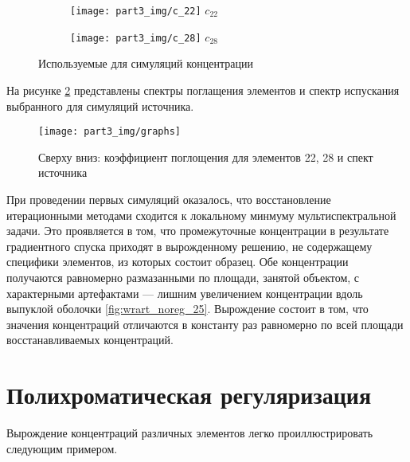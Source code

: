 \begin{figure}
\begin{subfigure}[h]{0.45\textwidth}
  \centering
    \texttt{[image: part3\_img/c\_22]}
  $c_22$
\end{subfigure}
\begin{subfigure}[h]{0.45\textwidth}
  \centering
    \texttt{[image: part3\_img/c\_28]}
  $c_28$
\end{subfigure}
  \caption{Используемые для симуляций концентрации}
\label{fig:white_phantom}
\end{figure}

На рисунке \ref{fig:source} представлены спектры поглащения элементов и спектр испускания выбранного для симуляций источника.

\begin{figure}
  \centering
  \texttt{[image: part3\_img/graphs]}
  \caption{Сверху вниз: коэффициент поглощения для элементов 22, 28 и спект источника}
  \label{fig:source}
\end{figure}

При проведении первых симуляций оказалось, что восстановление итерационными методами сходится к локальному минмуму мультиспектральной задачи.
Это проявляется в том, что промежуточные концентрации в результате градиентного спуска приходят в вырожденному решению, не содержащему специфики элементов, из которых состоит образец.
Обе концентрации получаются равномерно размазанными по площади, занятой объектом, с характерными артефактами --- лишним увеличением концентрации вдоль выпуклой оболочки \ref{fig:wrart_noreg_25}.
Вырождение состоит в том, что значения концентраций отличаются в константу раз равномерно по всей площади восстанавливаемых концентраций.



\section{Полихроматическая регуляризация}

Вырождение концентраций различных элементов легко проиллюстрировать следующим примером.


